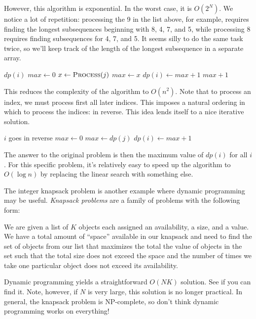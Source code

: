 \documentclass[11pt]{book}
\begin{document}
However, this algorithm is exponential. In the worst case, it is $O(2^N)$. We notice a lot of repetition: processing the 9 in the list above, for example, requires finding the longest subsequences beginning with 8, 4, 7, and 5, while processing 8 requires finding subsequences for 4, 7, and 5. It seems silly to do the same task twice, so we'll keep track of the length of the longest subsequence in a separate array.

\begin{algorithmic}
	\State \Return $dp(i)$
\EndIf
\State $max \gets 0$
		\State $x \gets \Call{Process}{j}$
			\State $max \gets x$
		\EndIf
	\EndIf
\EndFor
\State $dp(i) \gets max + 1$
\State \Return $max + 1$
\EndFunction
\end{algorithmic}

This reduces the complexity of the algorithm to $O(n^2)$. Note that to process an index, we must process first all later indices. This imposes a natural ordering in which to process the indices: in reverse. This idea lends itself to a nice iterative solution.

\begin{algorithmic}
	\Comment $i$ goes in reverse
	\State $max \gets 0$
				\State $max \gets dp(j)$
			\EndIf
		\EndIf
	\EndFor
	\State $dp(i) \gets max + 1$
\EndFor
\end{algorithmic}

The answer to the original problem is then the maximum value of $dp(i)$ for all $i$. For this specific problem, it's relatively easy to speed up the algorithm to $O(\log{n})$ by replacing the linear search with something else.

The integer knapsack problem is another example where dynamic programming may be useful. \textit{Knapsack problems} are a family of problems with the following form:

We are given a list of $K$ objects each assigned an availability, a size, and a value. We have a total amount of ``space'' available in our knapsack and need to find the set of objects from our list that maximizes the total the value of objects in the set such that the total size does not exceed the space and the number of times we take one particular object does not exceed its availability.

Dynamic programming yields a straightforward $O(NK)$ solution. See if you can find it. Note, however, if $N$ is very large, this solution is no longer practical. In general, the knapsack problem is NP-complete, so don't think dynamic programming works on everything!
\end{document}
